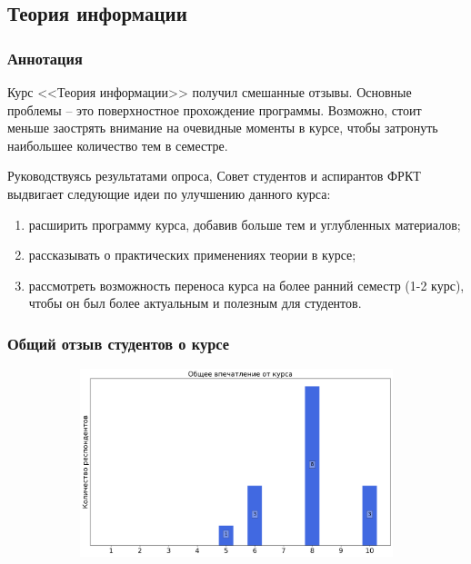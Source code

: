 \subsection{Теория информации}
	
	\subsubsection{Аннотация}

		Курс <<Теория информации>> получил смешанные отзывы. Основные проблемы -- это поверхностное прохождение программы. Возможно, стоит меньше заострять внимание на очевидные моменты в курсе, чтобы затронуть наибольшее количество тем в семестре.
		
		Руководствуясь результатами опроса, Совет студентов и аспирантов ФРКТ выдвигает следующие идеи по улучшению данного курса:
		\begin{enumerate}
			\item расширить программу курса, добавив больше тем и углубленных материалов;
			\item рассказывать о практических применениях теории в курсе;
			\item рассмотреть возможность переноса курса на более ранний семестр (1-2 курс), чтобы он был более актуальным и полезным для студентов.
		\end{enumerate}

	\subsubsection{Общий отзыв студентов о курсе}

		\begin{figure}[H]
			\centering
			\begin{subfigure}[b]{0.45\textwidth}
				\centering
				\includegraphics[width=\textwidth]{images/4 course/Теория информации/general-0.png}
			\end{subfigure}
		\end{figure}

